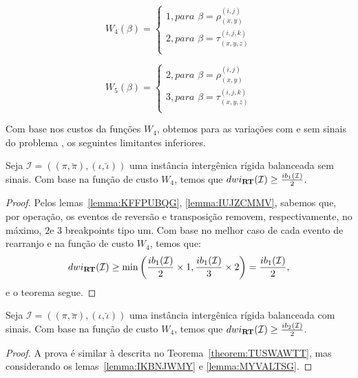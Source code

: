$$
  W_4(\beta) = \begin{cases}
      1, \textit{para } \beta = \rho_{(x,y)}^{(i,j)} \\
      2, \textit{para } \beta = \tau_{(x,y,z)}^{(i,j,k)} \\
  \end{cases}
$$ 

$$
  W_5(\beta) = \begin{cases}
      2, \textit{para } \beta = \rho_{(x,y)}^{(i,j)} \\
      3, \textit{para } \beta = \tau_{(x,y,z)}^{(i,j,k)} \\
  \end{cases}
$$

Com base nos custos da funções $W_4$, obtemos para as variações com e sem sinais do problema \SbWIRT{}, os seguintes limitantes inferiores.

\begin{theorem}\label{theorem:TUSWAWTT}
Seja $\mathcal{I} = ((\pi,\breve\pi),(\iota,\breve\iota))$ uma instância intergênica rígida balanceada sem sinais. Com base na função de custo $W_4$, temos que $dwi_{\textbf{RT}}(\mathcal{I}) \ge \frac{ib_1(\mathcal{I})}{2}$.
\begin{proof}
Pelos lemas~\ref{lemma:KFFPUBQG}, \ref{lemma:IUJZCMMV}, sabemos que, por operação, os eventos de reversão e transposição removem, respectivamente, no máximo, $2$e $3$ breakpoints tipo um. Com base no melhor caso de cada evento de rearranjo e na função de custo $W_4$, temos que:
$$dwi_{\textbf{RT}}(\mathcal{I}) \ge \min\left(\frac{ib_1(\mathcal{I})}{2} \times 1,\frac{ib_1(\mathcal{I})}{3} \times 2\right) = \frac{ib_1(\mathcal{I})}{2},$$ e o teorema segue.
\end{proof}
\end{theorem}

\begin{theorem}\label{theorem:RPTOVHAP}
Seja $\mathcal{I} = ((\pi,\breve\pi),(\iota,\breve\iota))$ uma instância intergênica rígida balanceada com sinais. Com base na função de custo $W_4$, temos que $dwi_{\textbf{RT}}(\mathcal{I}) \ge \frac{ib_2(\mathcal{I})}{2}$.
\begin{proof}
A prova é similar à descrita no Teorema~\ref{theorem:TUSWAWTT}, mas considerando os lemas~\ref{lemma:IKBNJWMY} e \ref{lemma:MYVALTSG}.
\end{proof}
\end{theorem}

